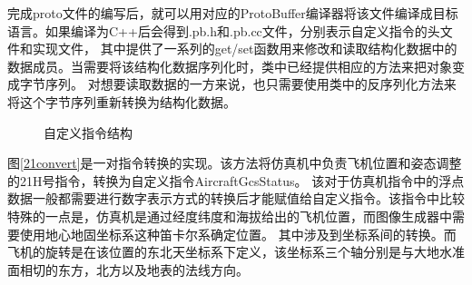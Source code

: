 \par
完成proto文件的编写后，就可以用对应的ProtoBuffer编译器将该文件编译成目标语言。如果编译为C++后会得到.pb.h和.pb.cc文件，分别表示自定义指令的头文件和实现文件，
其中提供了一系列的get/set函数用来修改和读取结构化数据中的数据成员。当需要将该结构化数据序列化时，类中已经提供相应的方法来把对象变成字节序列。
对想要读取数据的一方来说，也只需要使用类中的反序列化方法来将这个字节序列重新转换为结构化数据。
\begin{figure}[h!]
    \begin{center}
        
        \caption{自定义指令结构}
        \label{protostruct}
    \end{center}
\end{figure}
\par
图\ref{21convert}是一对指令转换的实现。该方法将仿真机中负责飞机位置和姿态调整的21H号指令，转换为自定义指令AircraftGcsStatus。
该对于仿真机指令中的浮点数据一般都需要进行数字表示方式的转换后才能赋值给自定义指令。该指令中比较特殊的一点是，仿真机是通过经度纬度和海拔给出的飞机位置，而图像生成器中需要使用地心地固坐标系这种笛卡尔系确定位置。
其中涉及到坐标系间的转换。而飞机的旋转是在该位置的东北天坐标系下定义，该坐标系三个轴分别是与大地水准面相切的东方，北方以及地表的法线方向。

